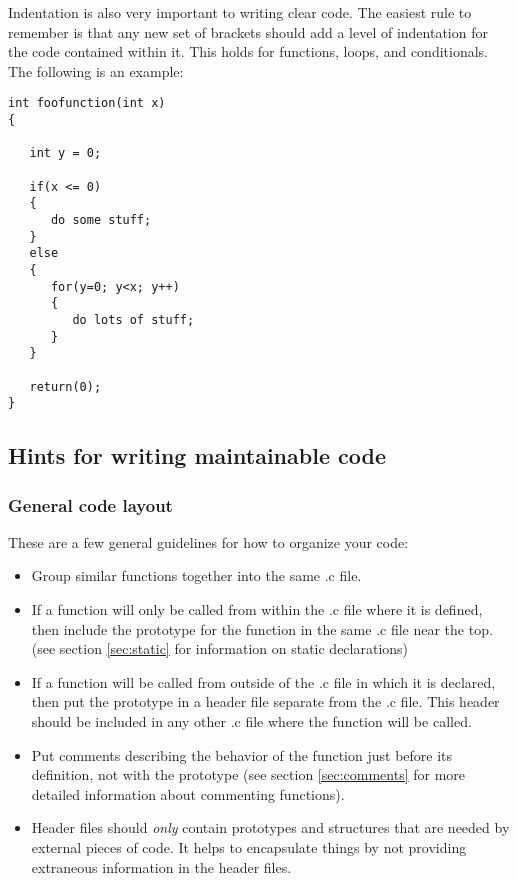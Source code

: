 \documentclass[11pt, letterpaper]{article}
\begin{document}
\label{sec:indent}
Indentation is also very important to writing clear code.  The easiest
rule to remember is that any new set of brackets should add a level of
indentation for the code contained within it.  This holds for functions,
loops, and conditionals.  The following is an example:

\begin{verbatim}
int foofunction(int x)
{

   int y = 0;

   if(x <= 0)
   {
      do some stuff;
   }
   else
   {
      for(y=0; y<x; y++)
      {
         do lots of stuff;
      }
   }

   return(0);
}
\end{verbatim}

\subsection{Hints for writing maintainable code}

\subsubsection{General code layout}
\label{sec:proto}
These are a few general guidelines for how to organize your code:

\begin{itemize}
	\item Group similar functions together into the same .c file.  
	\item If a function will only be called from within the .c file where
	it is defined, then include the prototype for the function in the
	same .c file near the top.  (see section \ref{sec:static} for
	information on static declarations)
	\item If a function will be called from outside of the .c file in
	which it is declared, then put the prototype in a header file
	separate from the .c file.  This header should be included in any
	other .c file where the function will be called.
	\item Put comments describing the behavior of the function just
	before its definition, not with the prototype  (see section
	\ref{sec:comments} for more detailed information about commenting
	functions).
	\item Header files should \emph{only} contain prototypes and structures
	that are needed by external pieces of code.  It helps to encapsulate things by not providing extraneous information in the
	header files.
\end{itemize}
\end{document}
